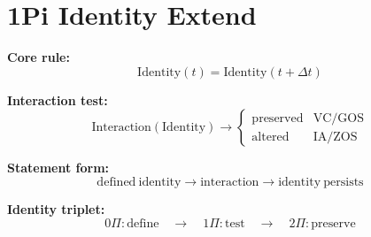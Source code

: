 \section*{1Pi Identity Extend}

\textbf{Core rule:}
\[
\mathrm{Identity}(t) = \mathrm{Identity}(t + \Delta t)
\]

\textbf{Interaction test:}
\[
\mathrm{Interaction}(\mathrm{Identity}) \rightarrow
\begin{cases}
\mathrm{preserved} & \text{VC/GOS} \\
\mathrm{altered} & \text{IA/ZOS}
\end{cases}
\]

\textbf{Statement form:}
\[
\mathrm{defined\ identity}
\rightarrow
\mathrm{interaction}
\rightarrow
\mathrm{identity\ persists}
\]

\textbf{Identity triplet:}
\[
0\Pi:\mathrm{define}
\quad\rightarrow\quad
1\Pi:\mathrm{test}
\quad\rightarrow\quad
2\Pi:\mathrm{preserve}
\]
